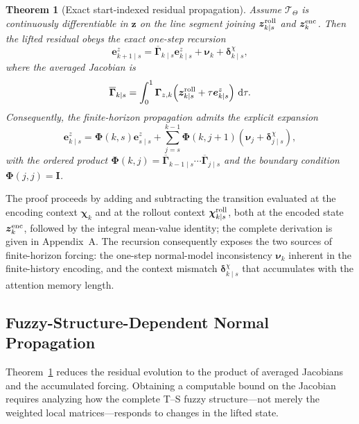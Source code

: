 \documentclass[journal]{IEEEtran}
\newtheorem{theorem}{Theorem}
\newcommand{\1}{\bm 1}
\begin{document}
\begin{theorem}[Exact start-indexed residual propagation]
\label{thm:exact}
Assume $\mathcal T_\Theta$ is continuously differentiable in $\bm z$ on the
line segment joining $\bm z_{k\mid s}^{\rm roll}$ and $\bm z_k^{\rm enc}$.
Then the lifted residual obeys the exact one-step recursion
\begin{equation}
\bm e_{k+1\mid s}^z
=\overline{\bm\Gamma}_{k\mid s}\bm e_{k\mid s}^z
+\bm\nu_k+\bm\delta_{k\mid s}^{\chi},
\label{eq:exact_recursion}
\end{equation}
where the averaged Jacobian is
\begin{equation}
\overline{\bm\Gamma}_{k\mid s}=
\int_0^1
\bm\Gamma_{z,k}\!\left(
\bm z_{k\mid s}^{\rm roll}
+\tau\bm e_{k\mid s}^z\right)\,\mathrm d\tau.
\label{eq:averaged_jacobian}
\end{equation}
Consequently, the finite-horizon propagation admits the explicit expansion
\begin{equation}
\bm e_{k\mid s}^z=
\bm\Phi(k,s)\bm e_{s\mid s}^z+
\sum_{j=s}^{k-1}\bm\Phi(k,j+1)
(\bm\nu_j+\bm\delta_{j\mid s}^{\chi}),
\label{eq:finite_propagation}
\end{equation}
with the ordered product $\bm\Phi(k,j)=
\overline{\bm\Gamma}_{k-1\mid s}\cdots
\overline{\bm\Gamma}_{j\mid s}$ and the boundary condition
$\bm\Phi(j,j)=\bm I$.
\end{theorem}

The proof proceeds by adding and subtracting the transition evaluated at the
encoding context $\bm\chi_k$ and at the rollout context
$\bm\chi_{k\mid s}^{\rm roll}$, both at the encoded state $\bm z_k^{\rm enc}$,
followed by the integral mean-value identity; the complete derivation is given
in Appendix~A. The recursion consequently exposes the two sources of
finite-horizon forcing: the one-step normal-model inconsistency $\bm\nu_k$
inherent in the finite-history encoding, and the context mismatch
$\bm\delta_{k\mid s}^{\chi}$ that accumulates with the attention memory length.

\subsection{Fuzzy-Structure-Dependent Normal Propagation}
Theorem~\ref{thm:exact} reduces the residual evolution to the product of
averaged Jacobians and the accumulated forcing. Obtaining a computable bound
on the Jacobian requires analyzing how the complete T--S fuzzy structure---not
merely the weighted local matrices---responds to changes in the lifted state.
\end{document}
